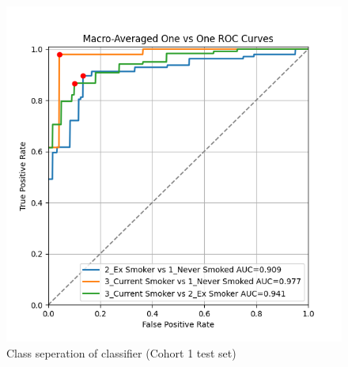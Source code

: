 \documentclass{article}
\begin{document}
\begin{figure}[H]
    \centering
    \includegraphics[width=0.75\linewidth]{cohort1_macro_ovo_roc.png}
    \caption{Class seperation of classifier (Cohort 1 test set)}
    \label{fig:macro-roc-cohort1}
\end{figure}
\end{document}
